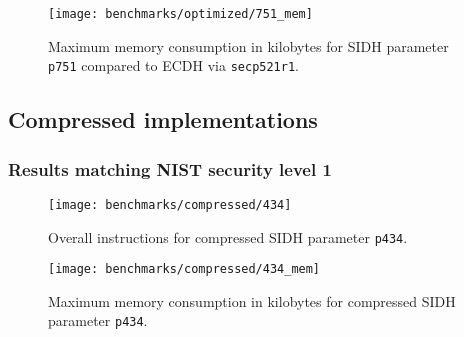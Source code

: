 \begin{figure}[H]
  \centering
  \texttt{[image: benchmarks/optimized/751\_mem]}
  \caption[Maximum memory consumption 751]
  {Maximum memory consumption in kilobytes for SIDH parameter \texttt{p751} compared to ECDH via \texttt{secp521r1}.}
  \label{fig:results_opt_751_mem}
\end{figure}

\subsection{Compressed implementations}\label{sec:results_compressed}

\subsubsection{Results matching NIST security level 1}
\begin{figure}[H]
  \centering
  \texttt{[image: benchmarks/compressed/434]}
  \caption[Overall instructions compressed p434]
  {Overall instructions for compressed SIDH parameter \texttt{p434}.}
  \label{fig:results_comp_434}
\end{figure}

\begin{figure}[H]
  \centering
  \texttt{[image: benchmarks/compressed/434\_mem]}
  \caption[Maximum memory consumption compressed p434]
  {Maximum memory consumption in kilobytes for compressed SIDH parameter \texttt{p434}.}
  \label{fig:results_comp_434_mem}
\end{figure}

